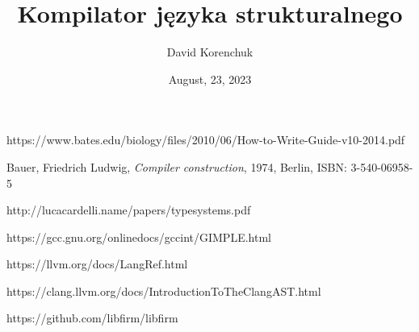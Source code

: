 \documentclass[leqno, 12pt]{article}
\title{Kompilator języka strukturalnego}
\author{David Korenchuk}
\date{August, 23, 2023}
\begin{document}
    \pagestyle{fancy}
    \lhead{\leftmark}
    \rhead{\thetitle}
    
    \setlength{\parindent}{0pt}

    \maketitle
	
	
	
	\newpage
	
	\newpage
	
	
	
	
	
	
	
	\newpage
	
	\newpage
	
	\newpage

	\begin{thebibliography}{9}
			https://www.bates.edu/biology/files/2010/06/How-to-Write-Guide-v10-2014.pdf
		
			Bauer, Friedrich Ludwig,
			\emph{Compiler construction},
			1974, Berlin,
			ISBN: 3-540-06958-5
		
			http://lucacardelli.name/papers/typesystems.pdf
	
			https://gcc.gnu.org/onlinedocs/gccint/GIMPLE.html

			https://llvm.org/docs/LangRef.html
		
			https://clang.llvm.org/docs/IntroductionToTheClangAST.html

			https://github.com/libfirm/libfirm
	\end{thebibliography}
	
	\newpage
	
    \tableofcontents
\end{document}
